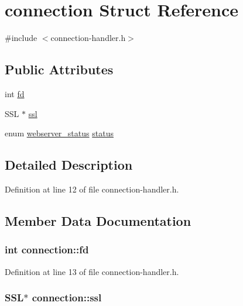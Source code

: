 \hypertarget{structconnection}{\section{connection Struct Reference}
\label{structconnection}
}


{\ttfamily \#include $<$connection-\/handler.\-h$>$}

\subsection*{Public Attributes}
\begin{DoxyCompactItemize}
\item 
int \hyperlink{structconnection_aa9a96cc6c66ef5a617f51247b2809a40}{fd}
\item 
S\-S\-L $\ast$ \hyperlink{structconnection_abaf979296936dbc887ace4543cb4fec5}{ssl}
\item 
enum \hyperlink{webserver_8h_a4b078d99ed3d03303ca3ba56f4a18d09}{webserver\-\_\-status} \hyperlink{structconnection_a70afd7d3c892d86014a13a5af6ce65e1}{status}
\end{DoxyCompactItemize}


\subsection{Detailed Description}


Definition at line 12 of file connection-\/handler.\-h.



\subsection{Member Data Documentation}
\hypertarget{structconnection_aa9a96cc6c66ef5a617f51247b2809a40}{
\subsubsection[{fd}]{\setlength{\rightskip}{0pt plus 5cm}int connection\-::fd}}\label{structconnection_aa9a96cc6c66ef5a617f51247b2809a40}


Definition at line 13 of file connection-\/handler.\-h.

\hypertarget{structconnection_abaf979296936dbc887ace4543cb4fec5}{
\subsubsection[{ssl}]{\setlength{\rightskip}{0pt plus 5cm}S\-S\-L$\ast$ connection\-::ssl}}\label{structconnection_abaf979296936dbc887ace4543cb4fec5}


